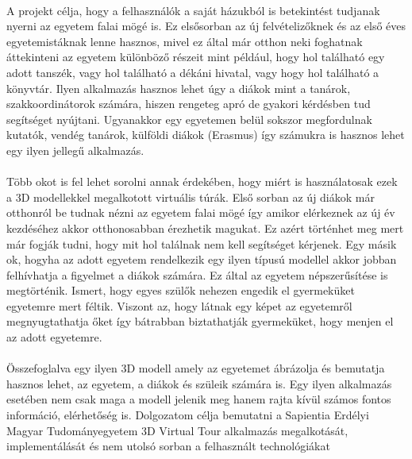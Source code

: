 \paragraph{}
A projekt célja, hogy a felhasználók a saját házukból is betekintést tudjanak nyerni az egyetem falai mögé is. Ez elsősorban az új felvételizőknek és az első éves egyetemistáknak lenne hasznos, mivel ez által már otthon neki foghatnak áttekinteni az egyetem különböző részeit mint például, hogy hol található egy adott tanszék, vagy hol található a dékáni hivatal, vagy hogy hol található a könyvtár. Ilyen alkalmazás hasznos lehet úgy a diákok mint a tanárok, szakkoordinátorok számára, hiszen rengeteg apró de gyakori kérdésben tud segítséget nyújtani. Ugyanakkor egy egyetemen belül sokszor megfordulnak kutatók, vendég tanárok, külföldi diákok (Erasmus) így számukra is hasznos lehet egy ilyen jellegű alkalmazás.
\paragraph{}
Több okot is fel lehet sorolni annak érdekében, hogy miért is használatosak ezek a 3D modellekkel megalkotott virtuális túrák. Első sorban az új diákok már otthonról be tudnak nézni az egyetem falai mögé így amikor elérkeznek az új év kezdéséhez akkor otthonosabban érezhetik magukat. Ez azért történhet meg mert már fogják tudni, hogy mit hol találnak nem kell segítséget kérjenek. Egy másik ok, hogyha az adott egyetem rendelkezik egy ilyen típusú modellel akkor jobban felhívhatja a figyelmet a diákok számára. Ez által az egyetem népszerűsítése is megtörténik. Ismert, hogy egyes szülők nehezen engedik el gyermeküket egyetemre mert féltik. Viszont az, hogy látnak egy  képet az egyetemről megnyugtathatja őket így bátrabban biztathatják gyermeküket, hogy menjen el az adott egyetemre. 
\paragraph{}
Összefoglalva egy ilyen 3D modell amely az egyetemet ábrázolja és bemutatja hasznos lehet, az egyetem, a diákok és szüleik számára is. Egy ilyen alkalmazás esetében nem csak maga a modell jelenik meg hanem rajta kívül számos fontos információ, elérhetőség is. Dolgozatom célja bemutatni a Sapientia Erdélyi Magyar Tudományegyetem 3D Virtual Tour alkalmazás megalkotását, implementálását és nem utolsó sorban a felhasznált technológiákat

